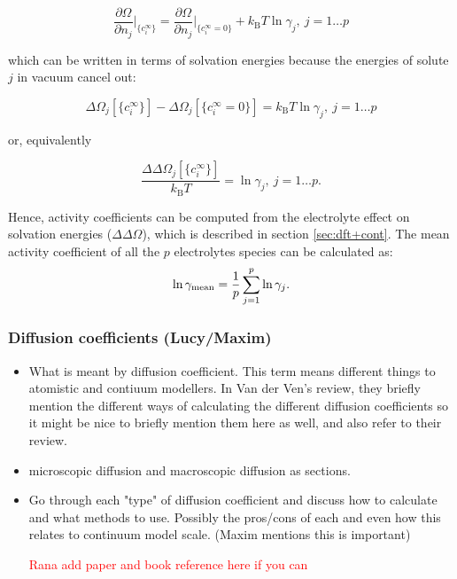 \documentclass[journal=jacsat,manuscript=article]{achemso}
\newcommand{\bvec}[1]{\mathbf{#1}}
\newcommand*{\rvec}{\bvec{r}}
\newcommand*{\ofrvec}{\!\left(\rvec\right)}
\newcommand*{\dens}{\rho}
\newcommand*{\cif}{c_i^{\infty}}
\newcommand*{\kb}{k_{\textrm{B}}}
\newcommand{\re}[1]{\textcolor{red}{#1}}
\begin{document}
\begin{equation}
    \label{eq:dtdn}
    \frac{\partial \Omega}{\partial n_j}\bigg|_{\{\cif\}}=\frac{\partial \Omega}{\partial n_j}\bigg|_{\{\cif=0\}}+ \kb T\ln{\gamma_j}, \ j=1\dots p
\end{equation}

which can be written in terms of solvation energies because the energies of solute $j$ in vacuum cancel out:

\begin{equation}
    \label{eq:dtc}
    \Delta\Omega_j\left[{\{\cif\}}\right]-\Delta\Omega_j\left[{\{\cif=0\}}\right]=\kb T \ln{\gamma_j}, \ j=1\dots p
\end{equation}

or, equivalently

\begin{equation}
    \label{eq:activityj}
    \frac{\Delta\Delta\Omega_j\left[\{\cif\}\right]}{\kb T} =\ln{\gamma_j}, \ j=1\dots p.
\end{equation}

Hence, activity coefficients can be computed from the electrolyte effect on solvation energies ($\Delta\Delta\Omega$), which is described in section \ref{sec:dft+cont}. The mean activity coefficient of all the $p$ electrolytes species can be calculated as:
\begin{equation}
    \label{eq:activitymean}
    \ln \gamma_{\rm mean} = \frac{1}{p}\sum_{j=1}^p \ln \gamma_j.
\end{equation}

\subsubsection{Diffusion coefficients (Lucy/Maxim)}
\begin{itemize}
    \item What is meant by diffusion coefficient. This term means different things to atomistic and contiuum modellers. In Van der Ven's review, they briefly mention the different ways of calculating the different diffusion coefficients so it might be nice to briefly mention them here as well, and also refer to their review.
    \item microscopic diffusion and macroscopic diffusion as sections.
    \item Go through each "type" of diffusion coefficient and discuss how to calculate and what methods to use. Possibly the pros/cons of each and even how this relates to continuum model scale. (Maxim mentions this is important)

    \re{Rana add paper and book reference here if you can}
\end{itemize}
\end{document}
